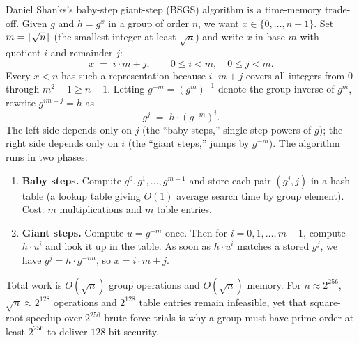 Daniel Shanks's baby-step giant-step (BSGS) algorithm is a time-memory trade-off. Given $g$ and $h = g^x$ in a group of order $n$, we want $x \in \{0, \dots, n-1\}$. Set $m = \lceil\sqrt{n}\rceil$ (the smallest integer at least $\sqrt{n}$) and write $x$ in base $m$ with quotient $i$ and remainder $j$:
\[
  x \;=\; i \cdot m + j, \qquad 0 \le i < m,\quad 0 \le j < m.
\]
Every $x < n$ has such a representation because $i \cdot m + j$ covers all integers from $0$ through $m^2 - 1 \ge n - 1$. Letting $g^{-m} = (g^m)^{-1}$ denote the group inverse of $g^m$, rewrite $g^{im+j} = h$ as
\[
  g^{j} \;=\; h \cdot (g^{-m})^{i}.
\]
The left side depends only on $j$ (the ``baby steps,'' single-step powers of $g$); the right side depends only
on $i$ (the ``giant steps,'' jumps by $g^{-m}$). The algorithm runs in two phases:

\begin{enumerate}
  \item \textbf{Baby steps.} Compute $g^0, g^1, \dots, g^{m-1}$ and store each pair $(g^j, j)$ in a hash table (a lookup table giving $O(1)$ average search time by group element). Cost: $m$ multiplications and $m$ table entries.
  \item \textbf{Giant steps.} Compute $u = g^{-m}$ once. Then for $i = 0, 1, \dots, m-1$, compute
    $h \cdot u^{i}$ and look it up in the table. As soon as $h \cdot u^{i}$ matches a stored
    $g^{j}$, we have $g^{j} = h \cdot g^{-im}$, so $x = i \cdot m + j$.
\end{enumerate}

Total work is $O(\sqrt{n})$ group operations and $O(\sqrt{n})$ memory. For $n \approx 2^{256}$, $\sqrt{n} \approx 2^{128}$ operations and $2^{128}$ table entries remain infeasible, yet that square-root speedup over $2^{256}$ brute-force trials is why a group must have prime order at least $2^{256}$ to deliver $128$-bit security.

